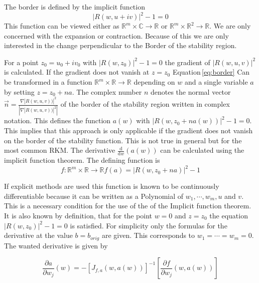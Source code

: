 \documentclass{article}
\begin{document}
The border is defined by the implicit function 
\begin{equation}\label{eq:border}
|R(w,u+iv)|^2 -1 = 0
\end{equation}
This function can be viewed either as $\mathbb{R}^m \times  \mathbb{C} \rightarrow \mathbb{R}$ or $\mathbb{R}^m \times  \mathbb{R}^2 \rightarrow \mathbb{R}$.
We are only concerned with the expansion or contraction. Because of this we are only interested in the change perpendicular to the Border of the stability region. 

For a point $z_0= u_0 +i v_0 $ 
with $ |R(w,z_0)|^2 -1 = 0 $ the gradient of
 $|R(w,u,v)|^2$ is calculated. 
If the gradient does not vanish at $z = z_0$ Equation\,\ref{eq:border} Can be transformed in a function $\mathbb{R}^m \times \mathbb{R} \rightarrow \mathbb{R}$ depending on $w$ and a single variable $a$ by setting $z = z_0 + n a$. The complex number $n$ denotes the normal vector $\vec{n} = \frac{\nabla |R(w,u,v))|^2}{\left| \nabla |R(w,u,v))|^2 \right|}$ of the border of the stability region written in complex notation. This defines the function $a(w)$ with $|R(w,z_0 + n a(w))|^2 -1 = 0$. 
This implies that this approach is only applicable if the gradient does not vanish on the border of the stability function. This is not true in general but for the most common RKM.
The derivative $\frac{\mathrm d}{\mathrm d w} (a(w))$ can be calculated using the implicit function theorem. The defining function is 
\begin{equation}\label{eq:f(w,a)}
f: \mathbb{R}^m \times \mathbb{R} \rightarrow \mathbb{R} f(a) = |R(w,z_0 + n a)|^2 -1 
\end{equation}

If explicit methods are used this function is known to be continuously differentiable because it can be written as a Polynomial of $w_1,\cdots,w_m,u$ and $v$. This is a necessary condition for the use of the of the Implicit function theorem. 
It is also known by definition, that for the point $w=0$ and $z = z_0$ the equation $ |R(w,z_0)|^2 -1 = 0 $ is satisfied.
For simplicity only the formulas for the derivative at the value $b = b_{orig}$ are given. This corresponds to $w_1 = \cdots = w_m = 0$.
The wanted derivative  is given by 

\begin{equation}
 \frac{\partial a}{\partial w_j} (w) =
 - \left[ J_{f,a}(w,a(w))  \right] ^{-1} 
   \left[ \frac{\partial f}{\partial w_j}(w,a(w)) \right]
\end{equation}
\end{document}
